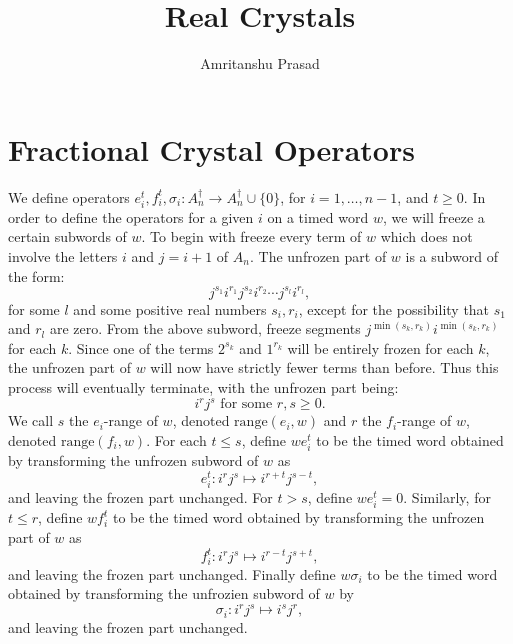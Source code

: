 \documentclass[12pt]{amsproc}
\title{Real Crystals}
\author{Amritanshu Prasad}
\newcommand{\range}{\mathrm{range}}
\theoremstyle{definition}
\begin{document}
\maketitle

\section{Fractional Crystal Operators}
\label{sec:frac-ops}
We define operators $e_i^t, f_i^t, \sigma_i:A_n^\dagger\to A_n^\dagger\cup \{0\}$, for $i=1,\dotsc,n-1$, and $t\geq 0$.
In order to define the operators for a given $i$ on a timed word $w$, we will freeze a certain subwords of $w$.
To begin with freeze every term of $w$ which does not involve the letters $i$ and $j=i+1$ of $A_n$.
The unfrozen part of $w$ is a subword of the form:
\begin{displaymath}
  j^{s_1}i^{r_1}j^{s_2}i^{r_2}\dotsb j^{s_l}i^{r_l},
\end{displaymath}
for some $l$ and some positive real numbers $s_i, r_i$, except for the possibility that $s_1$ and $r_l$ are zero.
From the above subword, freeze segments $j^{\min(s_k,r_k)}i^{\min(s_k,r_k)}$ for each $k$.
Since one of the terms $2^{s_k}$ and $1^{r_k}$ will be entirely frozen for each $k$, the unfrozen part of $w$ will now have strictly fewer terms than before.
Thus this process will eventually terminate, with the unfrozen part being:
\begin{displaymath}
  i^rj^s \text{ for some }r,s\geq 0.
\end{displaymath}
We call $s$ the $e_i$-range of $w$, denoted $\range(e_i,w)$ and $r$ the $f_i$-range of $w$, denoted $\range(f_i,w)$.
For each $t\leq s$, define $we_i^t$ to be the timed word obtained by transforming the unfrozen subword of $w$ as
\begin{displaymath}
  e_i^t: i^rj^s\mapsto i^{r+t}j^{s-t},
\end{displaymath}
and leaving the frozen part unchanged.
For $t>s$, define $we_i^t=0$.
Similarly, for $t\leq r$, define $wf_i^t$ to be the timed word obtained by transforming the unfrozen part of $w$ as
\begin{displaymath}
  f_i^t: i^rj^s\mapsto i^{r-t}j^{s+t},
\end{displaymath}
and leaving the frozen part unchanged.
Finally define $w\sigma_i$ to be the timed word obtained by transforming the unfrozien subword of $w$ by
\begin{displaymath}
  \sigma_i:i^rj^s\mapsto i^sj^r,
\end{displaymath}
and leaving the frozen part unchanged.
\end{document}
